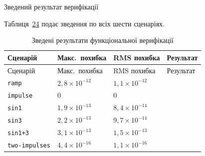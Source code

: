 Зведений результат верифікації

Таблиця~\hyperref[tab:verify_summary]{24} подає зведення по всіх шести
сценаріях.

\begin{longtable}[]{@{}
  >{\raggedright\arraybackslash}p{}
  >{\raggedright\arraybackslash}p{}
  >{\raggedright\arraybackslash}p{}
  >{\raggedright\arraybackslash}p{}@{}}
\caption{\protect{}\label{tab:verify_summary}{}Зведені
результати функціональної верифікації}\tabularnewline
\toprule\noalign{}
\begin{minipage}[b]{\linewidth}\raggedright
Сценарій
\end{minipage} & \begin{minipage}[b]{\linewidth}\raggedright
Макс.~похибка
\end{minipage} & \begin{minipage}[b]{\linewidth}\raggedright
RMS похибка
\end{minipage} & \begin{minipage}[b]{\linewidth}\raggedright
Результат
\end{minipage} \\
\midrule\noalign{}
\endfirsthead
\toprule\noalign{}
\begin{minipage}[b]{\linewidth}\raggedright
Сценарій
\end{minipage} & \begin{minipage}[b]{\linewidth}\raggedright
Макс.~похибка
\end{minipage} & \begin{minipage}[b]{\linewidth}\raggedright
RMS похибка
\end{minipage} & \begin{minipage}[b]{\linewidth}\raggedright
Результат
\end{minipage} \\
\midrule\noalign{}
\endhead
\bottomrule\noalign{}
\endlastfoot
\texttt{ramp} & \(2,8 \times 10^{- 12}\) & \(1,1 \times 10^{- 12}\) & \\
\texttt{impulse} & \(0\) & \(0\) & \\
\texttt{sin1} & \(1,9 \times 10^{- 13}\) & \(8,4 \times 10^{- 14}\) & \\
\texttt{sin3} & \(2,2 \times 10^{- 13}\) & \(9,7 \times 10^{- 14}\) & \\
\texttt{sin1+3} & \(3,1 \times 10^{- 13}\) & \(1,5 \times 10^{- 13}\)
& \\
\texttt{two-impulses} & \(4,4 \times 10^{- 16}\) &
\(1,1 \times 10^{- 16}\) & \\
\end{longtable}

